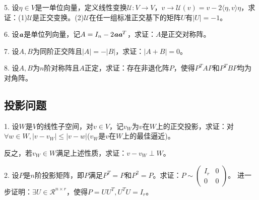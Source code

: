 \documentclass[UTF8,a4paper,12pt]{ctexart}
\begin{document}
5. 设$\eta\in V$是一单位向量，定义线性变换$\mathscr{U}:V\rightarrow V$，$v\rightarrow\mathscr{U}(v)=v-2\langle\eta,v\rangle\eta$，求证：(1)$\mathscr{U}$是正交变换。(2)$\mathscr{U}$在任一组标准正交基下的矩阵$U$有$\vert U\vert=-1$。

6. 设$\emph{\textbf{a}}$是单位列向量，记$A=I_n-2\emph{\textbf{a}}\emph{\textbf{a}}^T$，求证：$A$是正交对称阵。

7. 设$A,B$为同阶正交阵且$\vert A\vert=-\vert B\vert$，求证：$\vert A+B\vert=0$。

8. 设$A,B$为$n$阶对称阵且$A$正定，求证：存在非退化阵$P$，使得$P^TAP$和$P^TBP$均为对角阵。

\subsection{投影问题}
1. 设$W$是$V$的线性子空间，对$v\in V$，记$v_W$为$v$在$W$上的正交投影，求证：对$\forall w\in W, \vert v-v_W\vert\leqslant\vert v-w\vert$\quad ($v_W$是$v$在$W$上的最佳逼近)。

反之，若$v_W\in W$满足上述性质，求证：$v-v_W\perp W$。

2. 设$P$是$n$阶投影矩阵，即$P$满足$P^T=P$和$P^2=P$。求证：$P\sim
\begin{pmatrix}
I_r&0\\
0&0
\end{pmatrix}$。
进一步证明：$\exists U\in \mathscr{R}^{n\times r}$，使得$P=UU^T, U^TU=I_r$。
\end{document}
